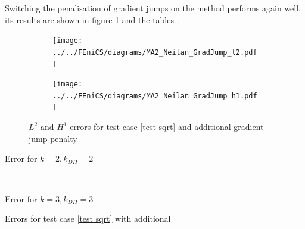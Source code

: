 Switching the penalisation of gradient jumps on the method performs again well, its results are shown in figure \ref{fig: l2 errors test 2 jump} and the tables . 
\begin{figure}[H]
\centering
\begin{subfigure}{\textwidth}
\centering
	\texttt{[image: ../../FEniCS/diagrams/MA2\_Neilan\_GradJump\_l2.pdf]}
\end{subfigure}

\begin{subfigure}{\textwidth}
\centering
	\texttt{[image: ../../FEniCS/diagrams/MA2\_Neilan\_GradJump\_h1.pdf]}
\end{subfigure}
	\caption{$L^2$ and $H^1$ errors for test case \ref{test sqrt} and additional gradient jump penalty}
	\label{fig: l2 errors test 2 jump}
\end{figure}
\begin{table}[H]
	\begin{subtable}[b]{0.45\textwidth}
		\centering
		\pgfplotstabletypeset[
		columns={iterations, l2error, h1error,N},
		every row 0 column 0/.style={set content=init},
		]{\MATwoJumpdegTwoTwo}
		\caption{Error for $k=2, k_{DH}=2$}
	\end{subtable}
	~
	\begin{subtable}[b]{0.45\textwidth}
		\centering
		\pgfplotstabletypeset[columns={iterations, l2error, h1error,N},
		every row 0 column 0/.style={set content=init},
		]{\MATwoJumpdegThreeThree}
		\caption{Error for $k=3, k_{DH}=3$}
	\end{subtable}
	\caption{Errors for test case \ref{test sqrt} with additional }
	\label{tab: l2 errors test 2 jump}
\end{table}

